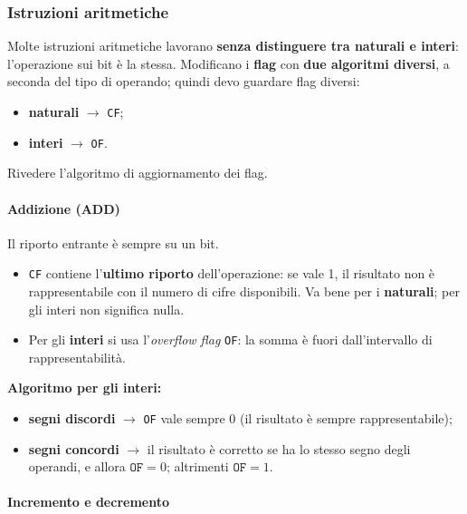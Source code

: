 \documentclass[11pt,a4paper]{article}
\begin{document}
\subsubsection*{Istruzioni aritmetiche}

Molte istruzioni aritmetiche lavorano \textbf{senza distinguere tra naturali e interi}: l'operazione sui bit è la stessa. Modificano i \textbf{flag} con \textbf{due algoritmi diversi}, a seconda del tipo di operando; quindi devo guardare flag diversi:
\begin{itemize}[leftmargin=*]
  \item \textbf{naturali} $\to$ \texttt{CF};
  \item \textbf{interi} $\to$ \texttt{OF}.
\end{itemize}

\begin{nota}
Rivedere l'algoritmo di aggiornamento dei flag.
\end{nota}

\paragraph*{Addizione (ADD)}

Il riporto entrante è sempre su un bit.

\begin{itemize}[leftmargin=*]
  \item \texttt{CF} contiene l'\textbf{ultimo riporto} dell'operazione: se vale 1, il risultato non è rappresentabile con il numero di cifre disponibili. Va bene per i \textbf{naturali}; per gli interi non significa nulla.
  \item Per gli \textbf{interi} si usa l'\emph{overflow flag} \texttt{OF}: la somma è fuori dall'intervallo di rappresentabilità.
\end{itemize}

\textbf{Algoritmo per gli interi:}
\begin{itemize}[leftmargin=*]
  \item \textbf{segni discordi} $\to$ \texttt{OF} vale sempre 0 (il risultato è sempre rappresentabile);
  \item \textbf{segni concordi} $\to$ il risultato è corretto se ha lo stesso segno degli operandi, e allora $\texttt{OF}=0$; altrimenti $\texttt{OF}=1$.
\end{itemize}

\paragraph*{Incremento e decremento}
\end{document}
